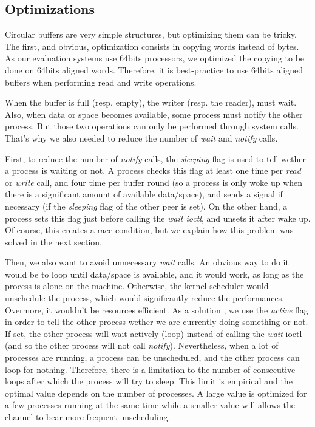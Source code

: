 \documentclass[journal]{IEEEtran}
\begin{document}
\subsection{Optimizations}

Circular buffers are very simple structures, but optimizing them can be tricky. The first, and obvious, optimization consists in copying words instead of bytes. As our evaluation systems use 64bits processors, we optimized the copying to be done on 64bits aligned words. Therefore, it is best-practice to use 64bits aligned buffers when performing read and write operations. 

When the buffer is full (resp. empty), the writer (resp. the reader), must wait. Also, when data or space becomes available, some process must notify the other process. But those two operations can only be performed through system calls. That's why we also needed to reduce the number of \emph{wait} and \emph{notify} calls. 

First, to reduce the number of \emph{notify} calls, the \emph{sleeping} flag is used to tell wether a process is waiting or not. A process checks this flag at least one time per \emph{read} or \emph{write} call, and four time per buffer round (so a process is only woke up when there is a significant amount of available data/space), and sends a signal if necessary (if the \emph{sleeping} flag of the other peer is set).
On the other hand, a process sets this flag just before calling the \emph{wait ioctl}, and unsets it after wake up. Of course, this creates a race condition, but we explain how this problem was solved in the next section.

Then, we also want to avoid unnecessary \emph{wait} calls. An obvious way to do it would be to loop until data/space is available, and it would work, as long as the process is alone on the machine. Otherwise, the kernel scheduler would unschedule the process, which would significantly reduce the performances. Overmore, it wouldn't be resources efficient.
As a solution , we use the \emph{active} flag in order to tell the other process wether we are currently doing something or not.
If set, the other process will wait actively (loop) instead of calling the \emph{wait} ioctl (and so the other process will not call \emph{notify}). Nevertheless, when a lot of processes are running, a process can be unscheduled, and the other process can loop for nothing. Therefore, there is a limitation to the number of consecutive loops after which the process will try to sleep. This limit is empirical and the optimal value depends on the number of processes. A large value is optimized for a few processes running at the same time while a smaller value will allows the channel to bear more frequent unscheduling.  
\end{document}
